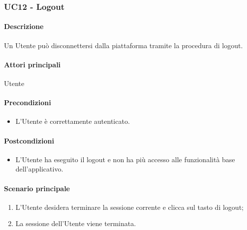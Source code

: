 \subsubsection{UC12 - Logout}\label{UC12}
\paragraph*{Descrizione}
Un Utente può disconnettersi dalla piattaforma tramite la procedura di logout.

\paragraph*{Attori principali}
Utente

\paragraph*{Precondizioni}
\begin{itemize}
  \item L’Utente è correttamente autenticato. 
\end{itemize}

\paragraph*{Postcondizioni}
\begin{itemize}
  \item L’Utente ha eseguito il logout e non ha più accesso alle funzionalità base dell’applicativo.
\end{itemize}

\paragraph*{Scenario principale}
\begin{enumerate}
  \item L’Utente desidera terminare la sessione corrente e clicca sul tasto di logout;
  \item La sessione dell’Utente viene terminata.  
\end{enumerate}
